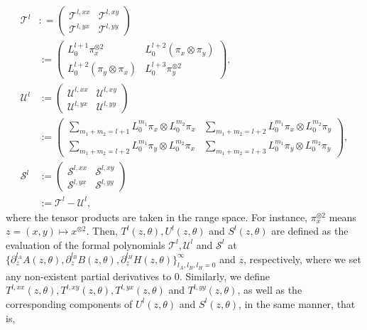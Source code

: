 \documentclass[a4paper,11pt]{jsarticle}
\begin{document}
\begin{align*}
   \mathscr{T}^l&: =\begin{pmatrix}
       \mathscr{T}^{l,xx} & \mathscr{T}^{l,xy} \\ \mathscr{T}^{l,yx} & \mathscr{T}^{l,yy}
   \end{pmatrix} \\ & :=\begin{pmatrix}
       L_0^{l+1} \pi_x^{\otimes  2} & L_0^{l+2}  (\pi_x \otimes \pi_y )\\
       L_0^{l+2}( \pi_y \otimes \pi_x)  &  L_0^{l+3} \pi_y^{\otimes 2}
   \end{pmatrix}, \\
   \mathscr{U}^l&:= \begin{pmatrix}
       \mathscr{U}^{l,xx} & \mathscr{U}^{l,xy} \\ \mathscr{U}^{l,yx} & \mathscr{U}^{l,yy}
   \end{pmatrix}\\ & := \begin{pmatrix}
       \sum_{m_1 +m_2 = l +1} L_0^{m_1} \pi_x \otimes L_0^{m_2} \pi_x & \sum_{m_1+m_2 = l +2} L_0^{m_1}\pi_x \otimes  L_0^{m_2} \pi_y  \\
       \sum_{m_1+m_2 = l +2} L_0^{m_1}\pi_y \otimes L_0^{m_2} \pi_x & \sum_{m_1 +m_2  = l +3} L_0^{m_1}\pi_y \otimes L_0^{m_2}\pi_y
   \end{pmatrix}, \\
   \mathscr{S}^l &  := \begin{pmatrix}
       \mathscr{S}^{l,xx} & \mathscr{S}^{l,xy} \\ \mathscr{S}^{l,yx} & \mathscr{S}^{l,yy}
   \end{pmatrix} \\ & := \mathscr{T}^l -\mathscr{U}^l,
\end{align*}
where  the tensor products are taken in the range space. For instance, $\pi_x^{\otimes 2} $ means $z = (x,y) \mapsto x^{\otimes 2} $. Then, 
$T^l(z,\theta),U^l(z,\theta)$ and $S^l(z,\theta)$ are defined as the evaluation of the formal polynomials $\mathscr{T}^l,\mathscr{U}^l$ and $\mathscr{S}^l$ at $\{\partial_z^{l_A} A(z,\theta), \partial_z^{l_B} B(z,\theta), \partial_z^{l_H} H(z , \theta)\}_{l_A,l_B,l_H =0}^{\infty}$ and $z$, respectively, where we set any non-existent partial derivatives to 0. Similarly, we define $T^{l,xx}(z,\theta),T^{l,xy}(z,\theta),T^{l,yx}(z,\theta) $ and $T^{l,yy}(z,\theta) $, as well as the corresponding components of $U^l(z,\theta)$ and $S^l(z,\theta)$, in the same manner, that is,
\end{document}
